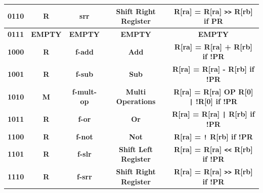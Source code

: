 \documentclass{article}
\begin{document}
\begin{table}[H]
\begin{tabular}{|c|*{4}{c|}}
        \multicolumn{1}{|c|}{\textbf{0110}}   & \multicolumn{1}{c|}{\textbf{R}}     & \multicolumn{1}{c|}{\textbf{srr}}       & \multicolumn{1}{c|}{\textbf{Shift Right Register}} & \multicolumn{1}{c|}{\textbf{R[ra] = R[ra] \texttt{>>} R[rb] if PR}}         \\ \hline
        \multicolumn{1}{|c|}{\textbf{0111}}   & \multicolumn{1}{c|}{\textbf{EMPTY}} & \multicolumn{1}{c|}{\textbf{EMPTY}}     & \multicolumn{1}{c|}{\textbf{EMPTY}}                & \multicolumn{1}{c|}{\textbf{EMPTY}}                                         \\ \hline
        \multicolumn{1}{|c|}{\textbf{1000}}   & \multicolumn{1}{c|}{\textbf{R}}     & \multicolumn{1}{c|}{\textbf{f-add}}     & \multicolumn{1}{c|}{\textbf{Add}}                  & \multicolumn{1}{c|}{\textbf{R[ra] = R[ra] + R[rb] if !PR}}                  \\ \hline
        \multicolumn{1}{|c|}{\textbf{1001}}   & \multicolumn{1}{c|}{\textbf{R}}     & \multicolumn{1}{c|}{\textbf{f-sub}}     & \multicolumn{1}{c|}{\textbf{Sub}}                  & \multicolumn{1}{c|}{\textbf{R[ra] = R[ra] - R[rb] if !PR}}                  \\ \hline
        \multicolumn{1}{|c|}{\textbf{1010}}   & \multicolumn{1}{c|}{\textbf{M}}     & \multicolumn{1}{c|}{\textbf{f-mult-op}} & \multicolumn{1}{c|}{\textbf{Multi Operations}}     & \multicolumn{1}{c|}{\textbf{R[ra] = R[ra] OP R[0] \texttt{|} !R[0] if !PR}} \\ \hline
        \multicolumn{1}{|c|}{\textbf{1011}}   & \multicolumn{1}{c|}{\textbf{R}}     & \multicolumn{1}{c|}{\textbf{f-or}}      & \multicolumn{1}{c|}{\textbf{Or}}                   & \multicolumn{1}{c|}{\textbf{R[ra] = R[ra] \texttt{|} R[rb] if !PR}}         \\ \hline
        \multicolumn{1}{|c|}{\textbf{1100}}   & \multicolumn{1}{c|}{\textbf{R}}     & \multicolumn{1}{c|}{\textbf{f-not}}     & \multicolumn{1}{c|}{\textbf{Not}}                  & \multicolumn{1}{c|}{\textbf{R[ra] = \texttt{!} R[rb] if !PR}}               \\ \hline
        \multicolumn{1}{|c|}{\textbf{1101}}   & \multicolumn{1}{c|}{\textbf{R}}     & \multicolumn{1}{c|}{\textbf{f-slr}}     & \multicolumn{1}{c|}{\textbf{Shift Left Register}}  & \multicolumn{1}{c|}{\textbf{R[ra] = R[ra] \texttt{<<} R[rb] if !PR}}        \\ \hline
        \multicolumn{1}{|c|}{\textbf{1110}}   & \multicolumn{1}{c|}{\textbf{R}}     & \multicolumn{1}{c|}{\textbf{f-srr}}     & \multicolumn{1}{c|}{\textbf{Shift Right Register}} & \multicolumn{1}{c|}{\textbf{R[ra] = R[ra] \texttt{>>} R[rb] if !PR}}        \\ \hline

\end{tabular}
\end{table}
\end{document}
